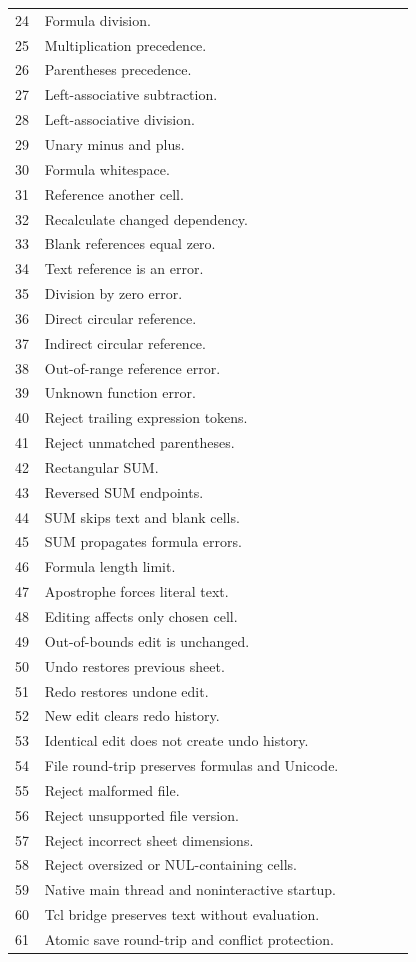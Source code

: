 \documentclass[11pt,letterpaper]{article}
\begin{document}
\begin{longtable}{@{}P{0.07\linewidth}P{0.87\linewidth}@{}}
24 & Formula division.\\
25 & Multiplication precedence.\\
26 & Parentheses precedence.\\
27 & Left-associative subtraction.\\
28 & Left-associative division.\\
29 & Unary minus and plus.\\
30 & Formula whitespace.\\
31 & Reference another cell.\\
32 & Recalculate changed dependency.\\
33 & Blank references equal zero.\\
34 & Text reference is an error.\\
35 & Division by zero error.\\
36 & Direct circular reference.\\
37 & Indirect circular reference.\\
38 & Out-of-range reference error.\\
39 & Unknown function error.\\
40 & Reject trailing expression tokens.\\
41 & Reject unmatched parentheses.\\
42 & Rectangular SUM.\\
43 & Reversed SUM endpoints.\\
44 & SUM skips text and blank cells.\\
45 & SUM propagates formula errors.\\
46 & Formula length limit.\\
47 & Apostrophe forces literal text.\\
48 & Editing affects only chosen cell.\\
49 & Out-of-bounds edit is unchanged.\\
50 & Undo restores previous sheet.\\
51 & Redo restores undone edit.\\
52 & New edit clears redo history.\\
53 & Identical edit does not create undo history.\\
54 & File round-trip preserves formulas and Unicode.\\
55 & Reject malformed file.\\
56 & Reject unsupported file version.\\
57 & Reject incorrect sheet dimensions.\\
58 & Reject oversized or NUL-containing cells.\\
59 & Native main thread and noninteractive startup.\\
60 & Tcl bridge preserves text without evaluation.\\
61 & Atomic save round-trip and conflict protection.\\
\bottomrule\end{longtable}
\end{document}

